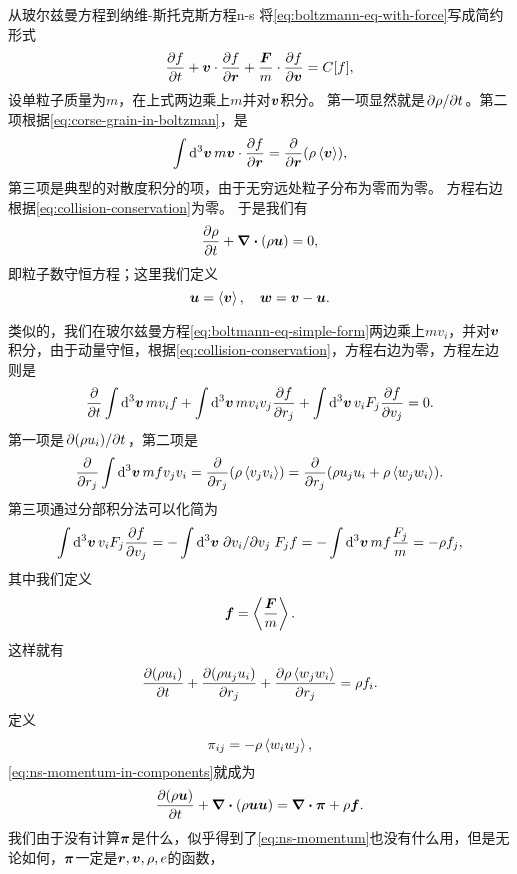 \begin{back}{从玻尔兹曼方程到纳维-斯托克斯方程}{n-s}
    将\eqref{eq:boltzmann-eq-with-force}写成简约形式
    \begin{equation}
        \pdv{f}{t} + \vb*{v} \cdot \pdv{f}{\vb*{r}} + \frac{\vb*{F}}{m} \cdot \pdv{f}{\vb*{v}} = C[f],
        \label{eq:boltmann-eq-simple-form}
    \end{equation}
    设单粒子质量为$m$，在上式两边乘上$m$并对$\vb*{v}$积分。
    第一项显然就是$\pdv*{\rho}{t}$。第二项根据\eqref{eq:corse-grain-in-boltzman}，是
    \[
        \int \dd[3]{\vb*{v}} m \vb*{v} \cdot \pdv{f}{\vb*{r}} = \pdv{\vb*{r}} (\rho \expval{\vb*{v}}),
    \]
    第三项是典型的对散度积分的项，由于无穷远处粒子分布为零而为零。
    方程右边根据\eqref{eq:collision-conservation}为零。
    于是我们有
    \begin{equation}
        \pdv{\rho}{t} + \div{(\rho \vb*{u})} = 0,
        \label{eq:ns-particle}
    \end{equation}
    即粒子数守恒方程；这里我们定义
    \begin{equation}
        \vb*{u} = \expval{\vb*{v}}, \quad \vb*{w} = \vb*{v} - \vb*{u}.
    \end{equation}
    
    类似的，我们在玻尔兹曼方程\eqref{eq:boltmann-eq-simple-form}两边乘上$m v_i$，并对$\vb*{v}$积分，由于动量守恒，根据\eqref{eq:collision-conservation}，方程右边为零，方程左边则是
    \[
        \pdv{t} \int \dd[3]{\vb*{v}} m v_i f + \int \dd[3]{\vb*{v}} m v_i v_j \pdv{f}{r_j} + \int \dd[3]{\vb*{v}} v_i F_j \pdv{f}{v_j} = 0.
    \]
    第一项是$\pdv*{(\rho u_i)}{t}$，第二项是
    \[
        \pdv{r_j} \int \dd[3]{\vb*{v}} mf v_j v_i = \pdv{r_j} (\rho \expval{v_j v_i}) = \pdv{r_j} (\rho u_j u_i + \rho \expval{w_j w_i}).
    \]
    第三项通过分部积分法可以化简为
    \[
        \int \dd[3]{\vb*{v}} v_i F_j \pdv{f}{v_j} = - \int \dd[3]{\vb*{v}} \pdv*{v_i}{v_j} F_j f = - \int \dd[3]{\vb*{v}} m f \frac{F_j}{m} = - \rho f_j,
    \]
    其中我们定义
    \begin{equation}
        \vb*{f} = \expval{\frac{\vb*{F}}{m}}.
    \end{equation}
    这样就有
    \begin{equation}
        \pdv{(\rho u_i)}{t} + \pdv{(\rho u_j u_i)}{r_j} + \pdv{\rho \expval*{w_j w_i}}{r_j} = \rho f_i.
        \label{eq:ns-momentum-in-components}
    \end{equation}
    定义
    \begin{equation}
        \pi_{ij} = - \rho \expval*{w_i w_j},
    \end{equation}
    \eqref{eq:ns-momentum-in-components}就成为
    \begin{equation}
        \pdv{(\rho \vb*{u})}{t} + \div{(\rho \vb*{u} \vb*{u})} = \div{\vb*{\pi}} + \rho \vb*{f}.
        \label{eq:ns-momentum}
    \end{equation}
    我们由于没有计算$\vb*{\pi}$是什么，似乎得到了\eqref{eq:ns-momentum}也没有什么用，但是无论如何，$\vb*{\pi}$一定是$\vb*{r}, \vb*{v}, \rho, e$的函数，


\end{back}
